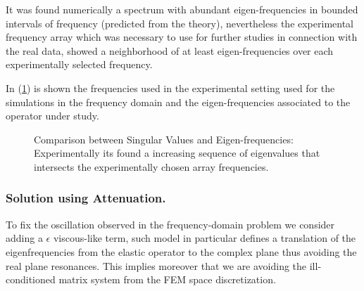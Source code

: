 It was found numerically a spectrum with abundant eigen-frequencies in bounded intervals of frequency (predicted from the theory), nevertheless the experimental frequency array which was necessary to use for further studies in connection with the real data, showed a neighborhood of at least eigen-frequencies over each experimentally selected frequency. 

In (\ref{EigenValuesComparison}) is shown the frequencies used in the experimental setting used for the simulations in the frequency domain and the eigen-frequencies associated to the operator under study.

\begin{figure}%
    \centering
    \qquad
    \caption{Comparison between Singular Values and Eigen-frequencies: Experimentally its found a increasing sequence of eigenvalues that intersects the experimentally chosen array frequencies.}%
    \label{EigenValuesComparison}%
\end{figure}


\subsubsection{Solution using Attenuation.}
To fix the oscillation observed in the frequency-domain problem we consider adding a $\epsilon$ viscous-like term, such model in particular defines a translation of the eigenfrequencies from the elastic operator to the complex plane thus avoiding the real plane resonances. This implies moreover that we are avoiding the ill-conditioned matrix system from the FEM space discretization.

